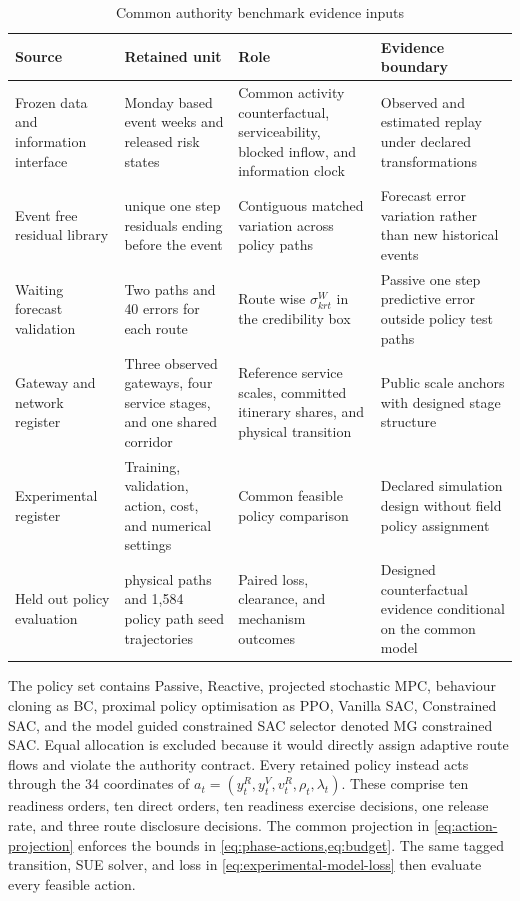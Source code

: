 \documentclass[a4paper,fleqn]{cas-sc}
\begin{document}
\begingroup
\setlength{\tabcolsep}{4pt}
\begin{table}[t]
\centering
\caption{Common authority benchmark evidence inputs}
\label{tab:522-benchmark-inputs}
\begin{tabular}{>{\RaggedRight\arraybackslash}p{}
                >{\RaggedRight\arraybackslash}p{}
                >{\RaggedRight\arraybackslash}p{}
                >{\RaggedRight\arraybackslash}p{}}
\toprule
Source & Retained unit & Role & Evidence boundary \\
\midrule
Frozen data and information interface
& 21 Monday based event weeks and released risk states
& Common activity counterfactual, serviceability, blocked inflow, and information clock
& Observed and estimated replay under declared transformations \\
Event free residual library
& 216 unique one step residuals ending before the event
& Contiguous matched variation across policy paths
& Forecast error variation rather than new historical events \\
Waiting forecast validation
& Two paths and 40 errors for each route
& Route wise $\sigma^W_{krt}$ in the credibility box
& Passive one step predictive error outside policy test paths \\
Gateway and network register
& Three observed gateways, four service stages, and one shared corridor
& Reference service scales, committed itinerary shares, and physical transition
& Public scale anchors with designed stage structure \\
Experimental register
& Training, validation, action, cost, and numerical settings
& Common feasible policy comparison
& Declared simulation design without field policy assignment \\
Held out policy evaluation
& 88 physical paths and 1,584 policy path seed trajectories
& Paired loss, clearance, and mechanism outcomes
& Designed counterfactual evidence conditional on the common model \\
\bottomrule
\end{tabular}
\end{table}
\endgroup

The policy set contains Passive, Reactive, projected stochastic MPC,
behaviour cloning as BC, proximal policy optimisation as PPO, Vanilla SAC,
Constrained SAC, and the model guided constrained SAC selector denoted MG
constrained SAC.
Equal allocation is excluded because it would directly assign adaptive route
flows and violate the authority contract. Every retained policy instead acts
through the 34 coordinates of
$a_t=(y_t^R,y_t^V,v_t^R,\rho_t,\lambda_t)$. These comprise ten readiness
orders, ten direct orders, ten readiness exercise decisions, one release rate,
and three route disclosure decisions. The common projection in
\cref{eq:action-projection} enforces the bounds in
\cref{eq:phase-actions,eq:budget}. The same tagged transition, SUE solver, and
loss in \cref{eq:experimental-model-loss} then evaluate every feasible action.
\end{document}
